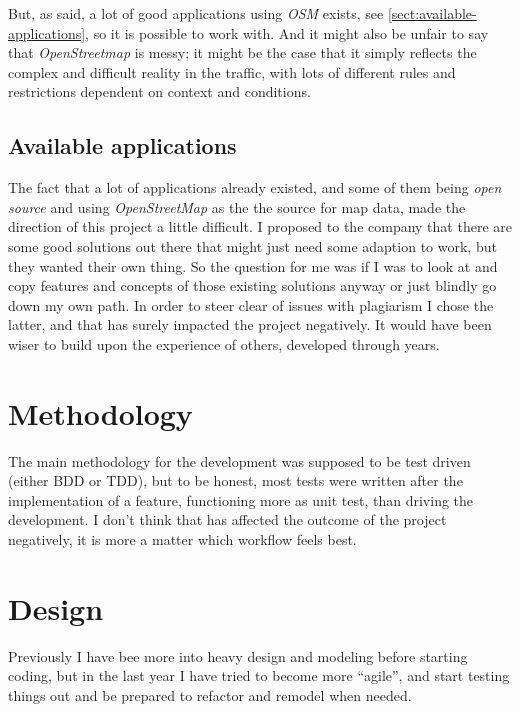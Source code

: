 \documentclass[../main.tex]{subfiles}
\begin{document}
But, as said, a lot of good applications using \textit{OSM} exists, see \ref{sect:available-applications}, so it is possible to work with. And it might also be unfair to say that \textit{OpenStreetmap} is messy; it might be the case that it simply reflects the complex and difficult reality in the traffic, with lots of different rules and restrictions dependent on context and conditions.

\subsection{Available applications}
The fact that a lot of applications already existed, and some of them being \textit{open source} and using \textit{OpenStreetMap} as the the source for map data, made the direction of this project a little difficult. I proposed to the company that there are some good solutions out there that might just need some adaption to work, but they wanted their own thing. So the question for me was if I was to look at and copy features and concepts of those existing solutions anyway or just blindly go down my own path. In order to steer clear of issues with plagiarism I chose the latter, and that has surely impacted the project negatively. It would have been wiser to build upon the experience of others, developed through years.


\section{Methodology}
The main methodology for the development was supposed to be test driven (either BDD or TDD), but to be honest, most tests were written after the implementation of a feature, functioning more as unit test, than driving the development. I don't think that has affected the outcome of the project negatively, it is more a matter which workflow feels best.


\section{Design}
Previously I have bee more into heavy design and modeling before starting coding, but in the last year I have tried to become more ``agile'', and start testing things out and be prepared to refactor and remodel when needed.
\end{document}
